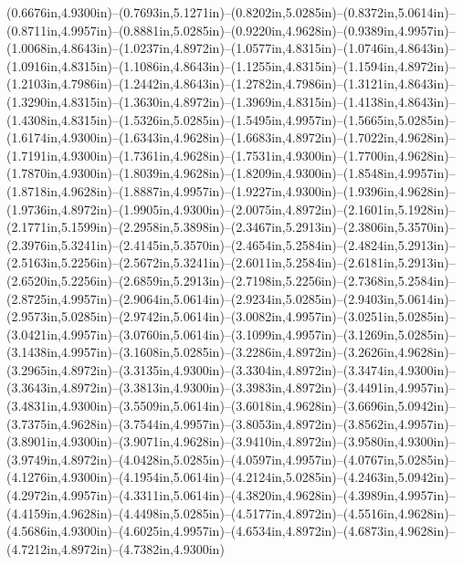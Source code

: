 (0.6676in,4.9300in)--(0.7693in,5.1271in)--(0.8202in,5.0285in)--(0.8372in,5.0614in)--(0.8711in,4.9957in)--(0.8881in,5.0285in)--(0.9220in,4.9628in)--(0.9389in,4.9957in)--(1.0068in,4.8643in)--(1.0237in,4.8972in)--(1.0577in,4.8315in)--(1.0746in,4.8643in)--(1.0916in,4.8315in)--(1.1086in,4.8643in)--(1.1255in,4.8315in)--(1.1594in,4.8972in)--(1.2103in,4.7986in)--(1.2442in,4.8643in)--(1.2782in,4.7986in)--(1.3121in,4.8643in)--(1.3290in,4.8315in)--(1.3630in,4.8972in)--(1.3969in,4.8315in)--(1.4138in,4.8643in)--(1.4308in,4.8315in)--(1.5326in,5.0285in)--(1.5495in,4.9957in)--(1.5665in,5.0285in)--(1.6174in,4.9300in)--(1.6343in,4.9628in)--(1.6683in,4.8972in)--(1.7022in,4.9628in)--(1.7191in,4.9300in)--(1.7361in,4.9628in)--(1.7531in,4.9300in)--(1.7700in,4.9628in)--(1.7870in,4.9300in)--(1.8039in,4.9628in)--(1.8209in,4.9300in)--(1.8548in,4.9957in)--(1.8718in,4.9628in)--(1.8887in,4.9957in)--(1.9227in,4.9300in)--(1.9396in,4.9628in)--(1.9736in,4.8972in)--(1.9905in,4.9300in)--(2.0075in,4.8972in)--(2.1601in,5.1928in)--(2.1771in,5.1599in)--(2.2958in,5.3898in)--(2.3467in,5.2913in)--(2.3806in,5.3570in)--(2.3976in,5.3241in)--(2.4145in,5.3570in)--(2.4654in,5.2584in)--(2.4824in,5.2913in)--(2.5163in,5.2256in)--(2.5672in,5.3241in)--(2.6011in,5.2584in)--(2.6181in,5.2913in)--(2.6520in,5.2256in)--(2.6859in,5.2913in)--(2.7198in,5.2256in)--(2.7368in,5.2584in)--(2.8725in,4.9957in)--(2.9064in,5.0614in)--(2.9234in,5.0285in)--(2.9403in,5.0614in)--(2.9573in,5.0285in)--(2.9742in,5.0614in)--(3.0082in,4.9957in)--(3.0251in,5.0285in)--(3.0421in,4.9957in)--(3.0760in,5.0614in)--(3.1099in,4.9957in)--(3.1269in,5.0285in)--(3.1438in,4.9957in)--(3.1608in,5.0285in)--(3.2286in,4.8972in)--(3.2626in,4.9628in)--(3.2965in,4.8972in)--(3.3135in,4.9300in)--(3.3304in,4.8972in)--(3.3474in,4.9300in)--(3.3643in,4.8972in)--(3.3813in,4.9300in)--(3.3983in,4.8972in)--(3.4491in,4.9957in)--(3.4831in,4.9300in)--(3.5509in,5.0614in)--(3.6018in,4.9628in)--(3.6696in,5.0942in)--(3.7375in,4.9628in)--(3.7544in,4.9957in)--(3.8053in,4.8972in)--(3.8562in,4.9957in)--(3.8901in,4.9300in)--(3.9071in,4.9628in)--(3.9410in,4.8972in)--(3.9580in,4.9300in)--(3.9749in,4.8972in)--(4.0428in,5.0285in)--(4.0597in,4.9957in)--(4.0767in,5.0285in)--(4.1276in,4.9300in)--(4.1954in,5.0614in)--(4.2124in,5.0285in)--(4.2463in,5.0942in)--(4.2972in,4.9957in)--(4.3311in,5.0614in)--(4.3820in,4.9628in)--(4.3989in,4.9957in)--(4.4159in,4.9628in)--(4.4498in,5.0285in)--(4.5177in,4.8972in)--(4.5516in,4.9628in)--(4.5686in,4.9300in)--(4.6025in,4.9957in)--(4.6534in,4.8972in)--(4.6873in,4.9628in)--(4.7212in,4.8972in)--(4.7382in,4.9300in)
